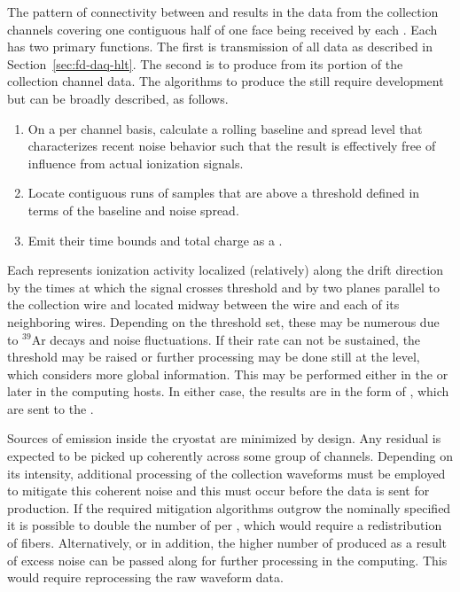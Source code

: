 The pattern of connectivity between  and  results in the data
from the collection channels covering one contiguous half of one 
face being received by each .
Each  has two primary functions. 
The first is transmission of all data as described in
Section~\ref{sec:fd-daq-hlt}. 
The second is to produce  from its portion of the
collection channel data.
The algorithms to produce the  still require
development but can be broadly described, as follows.

\begin{enumerate}
\item On a per channel basis, calculate a rolling baseline and spread
  level that characterizes recent noise behavior such that the result
  is effectively free of influence from actual ionization signals.
\item Locate contiguous runs of  samples that are above a threshold
  defined in terms of the baseline and noise spread.
\item Emit their time bounds and total charge as a .
\end{enumerate}

Each  represents ionization activity localized
(relatively) along the drift direction by the times at which the
signal crosses threshold and by two planes parallel to the collection
wire and located midway between the wire and each of its neighboring
wires.
Depending on the threshold set, these  may be
numerous due to $^{39}$Ar decays and noise fluctuations.
If their rate can not be sustained, the threshold may be raised or
further processing may be done still at the  level,  which
considers more global information.
This may be performed either in the  or later in the
 computing hosts. 
In either case, the results are in the form of ,
which are sent to the .

Sources of  emission inside the cryostat are minimized by
design. 
Any residual  is expected to be picked up coherently across
some group of channels. 
Depending on its intensity, additional processing of the collection
waveforms must be employed to mitigate this coherent noise and this
must occur before the data is sent for 
production. 
If the required mitigation algorithms outgrow the nominally specified
  it is possible to double the number of
 per , which would require a redistribution of fibers. 
Alternatively, or in addition, the higher number of
 produced as a result of excess noise can be
passed along for further processing in the  computing. 
This would require reprocessing the raw waveform data.

